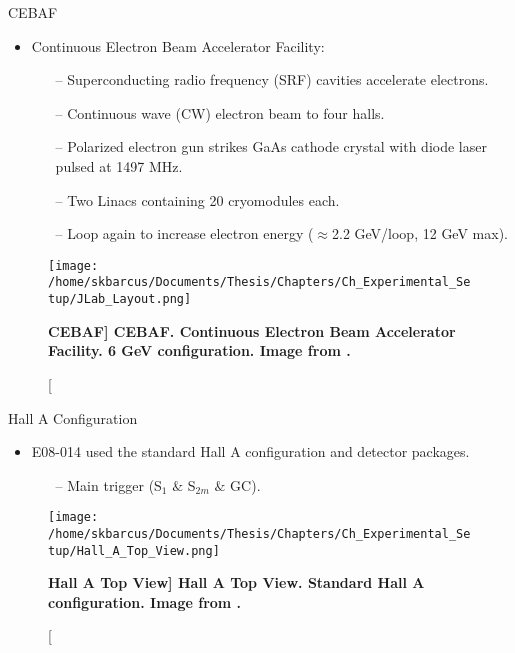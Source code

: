 \documentclass[10pt]{beamer}
\begin{document}
\begin{frame}[fragile]{CEBAF}
	\begin{itemize}
		\item \alert{C}ontinuous \alert{E}lectron \alert{B}eam \alert{A}ccelerator \alert{F}acility:
			\begin{itemize}
				\item[--] \alert{Superconducting radio frequency} (SRF) cavities accelerate electrons.
				\item[--] \alert{Continuous wave} (CW) electron beam to four halls.
				\item[--] Polarized electron gun strikes GaAs cathode crystal with diode laser pulsed at 1497 MHz.
				\item[--] Two Linacs containing 20 cryomodules each.
				\item[--] Loop again to increase electron energy ($\approx$2.2 GeV/loop, \alert{12 GeV max}).
			\end{itemize}
	\end{itemize}
	
	\vspace{-3mm}
	\begin{figure}[!ht]
	\begin{center}
	\texttt{[image: /home/skbarcus/Documents/Thesis/Chapters/Ch\_Experimental\_Setup/JLab\_Layout.png]}
	\end{center}
	\caption[\bf{CEBAF}]{
	{\bf{CEBAF.}} Continuous Electron Beam Accelerator Facility. 6 GeV configuration. Image from \cite{Article:HallA}.}
	\label{fig:halla_top}
	\end{figure}
	
\end{frame}

\begin{frame}[fragile]{Hall A Configuration}
	\begin{itemize}
		\item E08-014 used the standard Hall A configuration and detector packages.
			\begin{itemize}
				\item[--] Main trigger \alert{(S$_1$ $\&$ S$_{2m}$ $\&$ GC)}.
			\end{itemize}
	\end{itemize}
	
	\begin{figure}[!ht]
	\begin{center}
	\texttt{[image: /home/skbarcus/Documents/Thesis/Chapters/Ch\_Experimental\_Setup/Hall\_A\_Top\_View.png]}
	\end{center}
	\caption[\bf{Hall A Top View}]{
	{\bf{Hall A Top View.}} Standard Hall A configuration. Image from \cite{Thesis:Wang}.}
	\label{fig:halla_top}
	\end{figure}
	
\end{frame}
\end{document}
